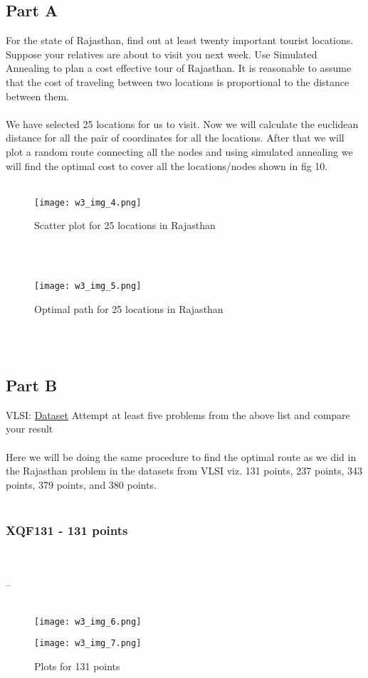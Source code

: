 \documentclass[conference]{IEEEtran}
\begin{document}
\subsection{Part A}
 For the state of Rajasthan, find out at least twenty important tourist locations.  Suppose your relatives are about to visit you next week.  Use Simulated Annealing to plan a cost effective tour of Rajasthan.  It is reasonable to assume that the cost of traveling between two locations is proportional to the distance between them.
\\
\\
We have selected 25 locations for us to visit. Now we will calculate the euclidean distance for all the pair of coordinates for all the locations. After that we will plot a random route connecting all the nodes and using simulated annealing we will find the optimal cost to cover all the locations/nodes shown in fig 10.\cite{b4}
\\
\\
\begin{figure}[htbp]
\centerline{\texttt{[image: w3\_img\_4.png]}}
\caption{Scatter plot for 25 locations in Rajasthan}
\label{fig}
\end{figure}
\\
\\

\begin{figure}[htbp]
\centerline{\texttt{[image: w3\_img\_5.png]}}
\caption{Optimal path for 25 locations in Rajasthan}
\label{fig}
\end{figure}
\\
\\


\subsection{Part B}
VLSI: \href{http://www.math.uwaterloo.ca/tsp/vlsi/index.html}{Dataset}
Attempt at least five problems from the above list and compare
your result
\\
\\

Here we will be doing the same procedure to find the optimal route as we did in the Rajasthan problem in the datasets from VLSI viz. 131 points, 237 points, 343 points, 379 points, and 380 points.
\\
\\
\subsubsection{XQF131 - 131 points}
\\
\\
--
\\
\\
\begin{figure}[htbp]
\centerline{\texttt{[image: w3\_img\_6.png]}}

\label{fig}
\end{figure}
\begin{figure}[htbp]
\centerline{\texttt{[image: w3\_img\_7.png]}}
\caption{Plots for 131 points}
\label{fig}
\end{figure}
\\
\\
\end{document}
